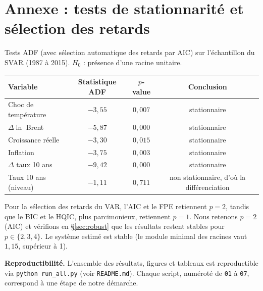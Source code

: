 \documentclass[11pt,a4paper]{article}
\begin{document}
\section{Annexe : tests de stationnarité et sélection des retards}
\label{ann:adf}
\small
Tests ADF (avec sélection automatique des retards par AIC) sur l'échantillon du SVAR
(1987 à 2015). $H_0$ : présence d'une racine unitaire.
\begin{table}[H]
\centering\small
\begin{tabular}{lccc}
\toprule
Variable & Statistique ADF & $p$-value & Conclusion \\
\midrule
Choc de température & $-3{,}55$ & $0{,}007$ & stationnaire \\
$\Delta\ln$ Brent & $-5{,}87$ & $0{,}000$ & stationnaire \\
Croissance réelle & $-3{,}30$ & $0{,}015$ & stationnaire \\
Inflation & $-3{,}75$ & $0{,}003$ & stationnaire \\
$\Delta$ taux 10 ans & $-9{,}42$ & $0{,}000$ & stationnaire \\
\midrule
Taux 10 ans (niveau) & $-1{,}11$ & $0{,}711$ & non stationnaire, d'où la différenciation \\
\bottomrule
\end{tabular}
\end{table}
Pour la sélection des retards du VAR, l'AIC et le FPE retiennent $p=2$, tandis que le BIC et le HQIC, plus
parcimonieux, retiennent $p=1$. Nous retenons $p=2$ (AIC) et vérifions en
\S\ref{sec:robust} que les résultats restent stables pour $p \in \{2,3,4\}$. Le système estimé
est stable (le module minimal des racines vaut $1{,}15$, supérieur à 1).

\textbf{Reproductibilité.} L'ensemble des résultats, figures et tableaux est reproductible
via \texttt{python run\_all.py} (voir \texttt{README.md}). Chaque script, numéroté de
\texttt{01} à \texttt{07}, correspond à une étape de notre démarche.
\normalsize
\end{document}

